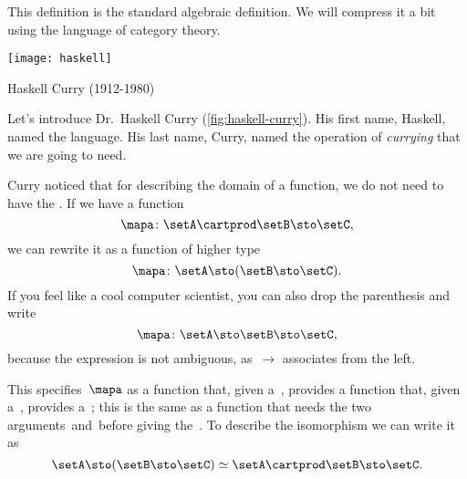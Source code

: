 This definition is the standard algebraic definition.
We will compress it a bit using the language of category theory.

\begin{marginfigure}
    \texttt{[image: haskell]}
    \caption{Haskell Curry (1912-1980)}
    \label{fig:haskell-curry}
\end{marginfigure}

Let's introduce Dr.~Haskell Curry (\cref{fig:haskell-curry}).
His first name, Haskell, named the language.
His last name, Curry, named the operation of \emph{currying} that we are going to need.

Curry noticed that for describing the domain of a function, we do not need to have the .
If we have a function
%
\begin{equation}
    \label{eq:currying-1}
    \mapa \colon \setA \cartprod \setB \sto \setC,
\end{equation}
%
we can rewrite it as a function of higher type
%
\begin{equation}
    \label{eq:currying-2}
    \mapa \colon \setA \sto ( \setB \sto \setC).
\end{equation}
%
If you feel like a cool computer scientist, you can also drop the parenthesis and write
%
\begin{equation}
    \label{eq:currying-3}
    \mapa \colon \setA \sto \setB \sto \setC,
\end{equation}
%
because the expression is not ambiguous, as~$\to$ associates from the left.

This specifies~$\mapa$ as a function that, given a~\setA, provides a function that, given a~\setB, provides a~\setC;
this is the same as a function that needs the two arguments~\setA and~\setB before giving the~\setC.
To describe the isomorphism we can write it as
\begin{equation}
    \label{eq:currying-iso-1}
    \setA \sto ( \setB \sto \setC) \simeq \setA \cartprod \setB \sto \setC.
\end{equation}


